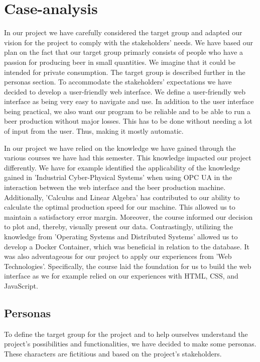 
\section{Case-analysis}
In our project we have carefully considered the target group and adapted our vision for the project to comply with the stakeholders' needs.
We have based our plan on the fact that our target group primarly consists of people who have a passion for 
producing beer in small quantities. We imagine that it could be intended for private consumption. The target group is described further in the personas section.
To accommodate the stakeholders' expectations we have decided to develop a user-friendly web interface. We define a user-friendly web interface as being very easy to navigate and use.
In addition to the user interface being practical, we also want our program to be reliable and to be able to run a 
beer production without major losses. This has to be done without needing a lot of input from the user. Thus, making it mostly automatic.

In our project we have relied on the knowledge we have gained through the various courses we have had this semester.
This knowledge impacted our project differently. We have for example identified the applicability of the knowledge gained in 'Industrial Cyber-Physical Systems' when using OPC UA in the 
interaction between the web interface and the beer production machine. Additionally, 'Calculus and Linear Algebra' has contributed to our ability to calculate the optimal production speed for our machine.
This allowed us to maintain a satisfactory error margin. Moreover, the course informed our decision to plot and, thereby, visually present our data.
Contrastingly, utilizing the knowledge from 'Operating Systems and Distributed Systems' allowed us to develop a Docker Container, which was beneficial in relation to the database.
It was also adventageous for our project to apply our experiences from 'Web Technologies'. Specifically, the course laid the foundation for us to build the web interface as we for example relied on 
our experiences with HTML, CSS, and JavaScript.



\subsection{Personas}
To define the target group for the project and to help ourselves understand the project's possibilities and functionalities, 
we have decided to make some personas. These characters are fictitious and based on the project's stakeholders. \newline

